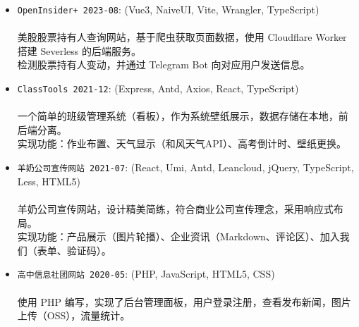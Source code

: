 \documentclass[zh]{resume}
\begin{document}

\begin{itemize}
  \item \texttt{OpenInsider+ 2023-08}:
    (Vue3, NaiveUI, Vite, Wrangler, TypeScript)\\
    \\
    美股股票持有人查询网站，基于爬虫获取页面数据，使用 Cloudflare Worker 搭建 Severless 的后端服务。\\
    检测股票持有人变动，并通过 Telegram Bot 向对应用户发送信息。
  \item \texttt{ClassTools 2021-12}:
    (Express, Antd, Axios, React, TypeScript)\\
    \\
    一个简单的班级管理系统（看板），作为系统壁纸展示，数据存储在本地，前后端分离。\\
    实现功能：作业布置、天气显示（和风天气API）、高考倒计时、壁纸更换。
  \item \texttt{羊奶公司宣传网站 2021-07}:
    (React, Umi, Antd, Leancloud, jQuery, TypeScript, Less, HTML5)\\
    \\
    羊奶公司宣传网站，设计精美简练，符合商业公司宣传理念，采用响应式布局。\\
    实现功能：产品展示（图片轮播）、企业资讯（Markdown、评论区）、加入我们（表单、验证码）。
  \item {\texttt{高中信息社团网站 2020-05}}:
    (PHP, JavaScript, HTML5, CSS)\\
    \\
    使用 PHP 编写，实现了后台管理面板，用户登录注册，查看发布新闻，图片上传（OSS），流量统计。
\end{itemize}
\end{document}
